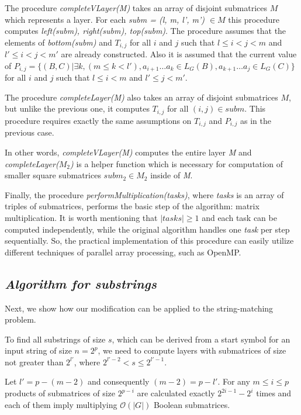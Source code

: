 The procedure \textit{completeVLayer(M)} takes an array of disjoint submatrices $M$ which represents a layer.
For each \textit{subm = (l, m, l', m') $\in M$} this procedure computes \textit{left(subm), right(subm), top(subm)}.
The procedure assumes that the elements of \textit{bottom(subm)} and $T_{i, j}$ for all $i$ and $j$ such that $l \leq i < j < m$ and $  l' \leq i < j < m'$ are already constructed.
Also it is assumed that the current value of
$P_{i, j} =  \{ (B, C) | \exists k, (m \le k < l'), a_{i + 1} \dots a_{k} \in L_G(B), a_{k + 1} \dots a_{j} \in L_G(C)\} $ for all $i$ and $j$ such that $l \leq i < m$ and $l' \leq j < m'$.

The procedure \textit{completeLayer(M)} also takes an array of disjoint submatrices $M$, but unlike the previous one, it computes $T_{i, j}$ for all $(i, j) \in subm$.
This procedure requires exactly the same assumptions on $T_{i, j}$  and $P_{i, j}$  as in the previous case.

In other words, \textit{completeVLayer(M)} computes the entire layer \textit{M} \linebreak and \textit{completeLayer($M_{2}$)} is a helper function which is necessary for computation of smaller square submatrices $subm_{2} \in M_{2}$ inside of \textit{M}.

Finally, the procedure \textit{performMultiplication(tasks)}, where \textit{tasks} is an array of triples of submatrices, performs the basic step of the algorithm: matrix multiplication.
It is worth mentioning that $|tasks| \ge 1$ and each task can be computed independently, while the original algorithm handles one \textit{task} per step sequentially.
So, the practical implementation of this procedure can easily utilize different techniques of parallel array processing, such as OpenMP.

\subsection{\bf \it Algorithm for substrings}

Next, we show how our modification can be applied to the string-matching problem.

To find all substrings of size $s$, which can be derived from a start symbol for an input string of size $n = 2^p$, we need to compute layers with submatrices of size not greater than $2^{l'}$, where $2^{l' - 2} < s \le 2^{l' - 1}$.

Let $l' = p - (m - 2)$ and consequently $(m - 2) = p - l'$.
For any  $m \le i \le p$ products of submatrices of size $2^{p - i}$ are calculated exactly $2^{2i - 1} - 2^{i}$ times and each of them imply multiplying $\mathcal{O}(|G|)$ Boolean submatrices.

